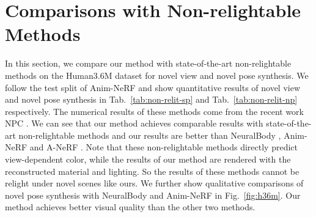 \section{Comparisons with Non-relightable Methods}
In this section, we compare our method with state-of-the-art non-relightable methods on the Human3.6M \cite{h36m} dataset for novel view and novel pose synthesis.
We follow the test split of Anim-NeRF \cite{animatablenerf} and show quantitative results of novel view and novel pose synthesis in Tab.~\ref{tab:non-relit-sp} and Tab.~\ref{tab:non-relit-np} respectively.
The numerical results of these methods come from the recent work NPC \cite{su2023npc}.
We can see that our method achieves comparable results with state-of-the-art non-relightable methods and our results are better than NeuralBody \cite{neuralbody}, Anim-NeRF \cite{animatablenerf} and A-NeRF \cite{a-nerf}.
Note that these non-relightable methods directly predict view-dependent color, while the results of our method are rendered with the reconstructed material and lighting. 
So the results of these methods cannot be relight under novel scenes like ours.
We further show qualitative comparisons of novel pose synthesis with NeuralBody \cite{neuralbody} and Anim-NeRF \cite{animatablenerf} in Fig.~\ref{fig:h36m}.
Our method achieves better visual quality than the other two methods.


